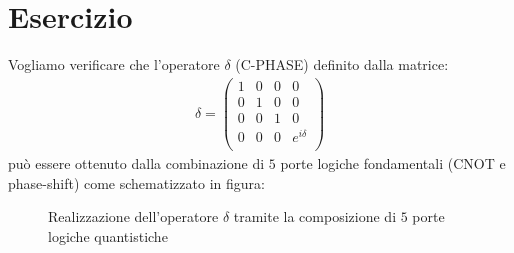 \documentclass[../../InformazioneQuantistica.tex]{subfiles}
\begin{document}
\section{Esercizio \theEsercizio}
Vogliamo verificare che l'operatore $\delta$ (C-PHASE) definito dalla matrice:
\begin{align*}
\delta = \left(
        \begin{array}{cc|cc}
        1 & 0 & 0 & 0 \\
        0 & 1 & 0 & 0 \\
        \hline
        0 & 0 & 1 & 0 \\
        0 & 0 & 0 & e^{i\delta} \\        
        \end{array}
\right) 
\end{align*}
può essere ottenuto dalla combinazione di $5$ porte logiche fondamentali (CNOT e phase-shift) come schematizzato in figura:
\begin{figure}[H]
\centering

\caption{Realizzazione dell'operatore $\delta$ tramite la composizione di $5$ porte logiche quantistiche\label{fig:delta-operator}}
\end{figure}
\end{document}
